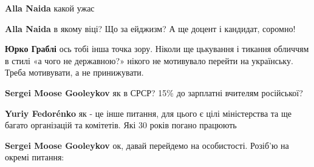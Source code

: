 \begin{itemize}
\begin{itemize}
 
\textbf{Alla Naida} какой ужас

 
\textbf{Alla Naida} в якому віці? Що за ейджизм? А ще доцент і кандидат, соромно!
\end{itemize}

 

\textbf{Юрко Граблі} ось тобі інша точка зору. Ніколи ще цькування і тикання обличчям в
стилі «а чого не державною?» нікого не мотивувало перейти на українську. Треба
мотивувати, а не принижувати.

\begin{itemize}
 
\textbf{Sergei Moose Gooleykov} як в СРСР? 15\% до зарплатні вчителям російської?

 
\textbf{Yuriy Fedorénko} як - це інше питання, для цього є цілі міністерства та ще багато організацій та комітетів. Які 30 років погано працюють

 
\textbf{Sergei Moose Gooleykov} ок, давай перейдемо на особистості. Розіб'ю на окремі питання:


\end{itemize}
\end{itemize}
